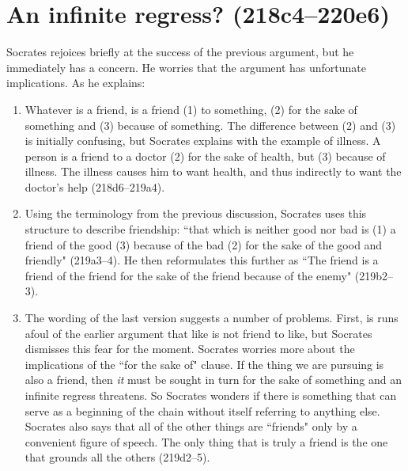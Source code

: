 \documentclass[11pt]{article}
\begin{document}

\section{An infinite regress? (218c4--220e6)}

Socrates rejoices briefly at the success of the previous argument, but he
immediately has a concern.  He worries that the argument has unfortunate
implications.  As he explains:

\begin{enumerate}

    \item Whatever is a friend, is a friend (1) to something, (2) for the sake
        of something and (3) because of something.  The difference between (2)
        and (3) is initially confusing, but Socrates explains with the example
        of illness.  A person is a friend to a doctor (2) for the sake of
        health, but (3) because of illness.  The illness causes him to want
        health, and thus indirectly to want the doctor's help (218d6--219a4).

    \item Using the terminology from the previous discussion, Socrates uses
        this structure to describe friendship: ``that which is neither good nor
        bad is (1) a friend of the good (3) because of the bad (2) for the sake
        of the good and friendly" (219a3--4).  He then reformulates this
        further as ``The friend is a friend of the friend for the sake of the
        friend because of the enemy" (219b2--3).

    \item The wording of the last version suggests a number of problems.
        First, is runs afoul of the earlier argument that like is not friend to
        like, but Socrates dismisses this fear for the moment.  Socrates
        worries more about the implications of the ``for the sake of" clause.
        If the thing we are pursuing is also a friend, then \emph{it} must be
        sought in turn for the sake of something and an infinite regress
        threatens.  So Socrates wonders if there is something that can serve as
        a beginning of the chain without itself referring to anything else.
        Socrates also says that all of the other things are ``friends" only by
        a convenient figure of speech.  The only thing that is truly a friend
        is the one that grounds all the others (219d2--5).

\end{enumerate}
\end{document}
